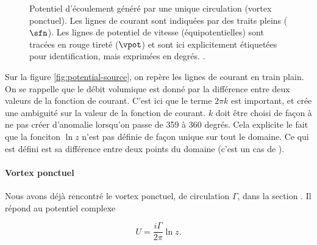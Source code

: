 \begin{figure}[h!]
    \centering
    
    \begin{minipage}[t]{0.49\textwidth}
        \centering
        
        \caption{Potentiel d'écoulement généré par une unique source (débit massique positif). Les lignes de courant (streamlines) sont indiquées par des traits pleins et représentent la fonction de courant $\sfn$ (Streamfunction). Les lignes de potentiel de vitesse (équipotentielles) sont tracées en rouge tiretés et représentent le potentiel de vitesse $\vpot$.}
        \label{fig:potential-source}
    \end{minipage}%
    \hfill%
    \begin{minipage}[t]{0.49\textwidth}
        \centering
        
        \caption{Potentiel d'écoulement généré par une unique circulation (vortex ponctuel). Les lignes de courant sont indiquées par des traits pleins ($\sfn$). Les lignes de potentiel de vitesse (équipotentielles) sont tracées en rouge tireté ($\vpot$) et sont ici explicitement étiquetées pour identification, mais exprimées en degrés. .}
        \label{fig:potential-circulation}
    \end{minipage}
\end{figure}


Sur la figure \ref{fig:potential-source}, on repère les lignes de courant en train plain. On se rappelle que le débit volumique est donné par la différence entre deux valeurs de la fonction de courant. C'est ici que le terme $2\pi k$  est important, et crée une ambiguité sur la valeur de la fonction de courant. $k$ doit être choisi de façon à ne pas créer d'anomalie lorsqu'on passe de 359 à 360 degrés. Cela explicite le fait que la fonciton $\ln z$ n'est pas définie de façon unique sur tout le domaine. Ce qui est défini est sa différence entre deux points du domaine (c'est un cas de ). 

\paragraph{Vortex ponctuel}

Nous avons déjà rencontré le vortex ponctuel, de circulation $\Gamma$, dans la section \label{para:vortex_ponctuel}. Il répond au potentiel complexe 

\begin{displaymath}
  U = \frac{i\Gamma}{2\pi}\ln z. 
\end{displaymath}

